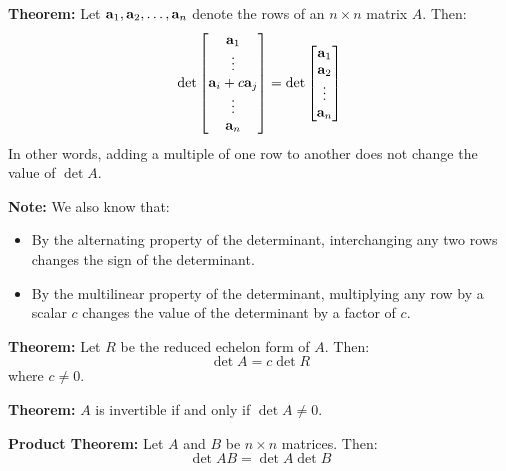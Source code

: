 \documentclass{article}
\begin{document}
    \begin{minipage}[t]{0.45\linewidth}
        \textbf{Theorem:} Let $\mathbf{a}_1,\mathbf{a}_2,\dots,\mathbf{a}_n$ denote the rows of an $n\times n$ matrix $A$. Then:
        \begin{equation*}
            \det\begin{bmatrix}
                \mathbf{a}_1 \\ \vdots \\ \mathbf{a}_i + c\mathbf{a}_j \\ \vdots \\ \mathbf{a}_n
            \end{bmatrix} = \det \begin{bmatrix}
                \mathbf{a}_1 \\ \mathbf{a}_2 \\ \vdots \\ \mathbf{a}_n
            \end{bmatrix}
        \end{equation*}
        In other words, adding a multiple of one row to another does not change the value of $\det A$.
        \vspace{2mm}

        \textbf{Note:} We also know that:
        \begin{itemize}
            \item By the alternating property of the determinant, interchanging any two rows changes the sign of the determinant.
            \item By the multilinear property of the determinant, multiplying any row by a scalar $c$ changes the value of the determinant by a factor of $c$.
        \end{itemize}
        \vspace{2mm}

        \textbf{Theorem:} Let $R$ be the reduced echelon form of $A$. Then:
        \begin{equation*}
            \det A = c\det R
        \end{equation*}
        where $c\neq 0$.
        \vspace{2mm}

        \textbf{Theorem:} $A$ is invertible if and only if $\det A \neq 0$.
        \vspace{2mm}

        \textbf{Product Theorem:} Let $A$ and $B$ be $n\times n$ matrices. Then:
        \begin{equation*}
            \det AB = \det A \det B
        \end{equation*}
        \vspace{2mm}


\end{minipage}
\end{document}
